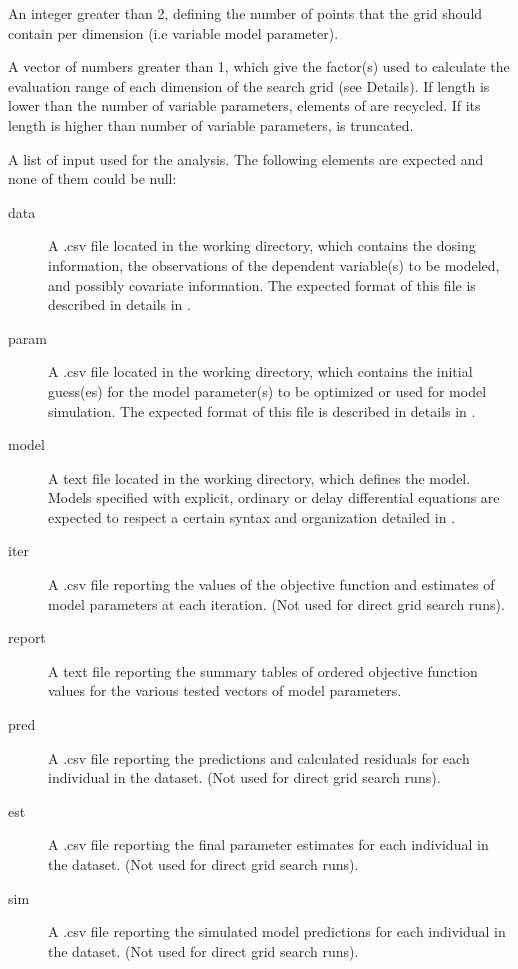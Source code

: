 \begin{Arguments}
\begin{ldescription}
\begin{description}
\end{description}


\item[\code{npts}] An integer greater than 2, defining the number of points that the 
grid should contain per dimension (i.e variable model parameter).

\item[\code{alpha}] A vector of numbers greater than 1, which give the factor(s) used
to calculate the evaluation range of each dimension of the search grid (see 
Details). If  length is lower than the number of variable 
parameters, elements of  are recycled. If its length is higher 
than number of variable parameters,  is truncated.

\item[\code{files}] A list of input used for the analysis. The following elements are
expected and none of them could be null: \begin{description}

\item[data] A .csv file located in the working directory, which contains
the dosing information, the observations of the dependent variable(s)
to be modeled, and possibly covariate information. The expected format 
of this file is described in details in .
\item[param] A .csv file located in the working directory, which contains
the initial guess(es) for the model parameter(s) to be optimized or used
for model simulation. The expected format of this file is described in
details in .
\item[model] A text file located in the working directory, which defines 
the model. Models specified with explicit, ordinary or delay 
differential equations are expected to respect a certain syntax and 
organization detailed in .
\item[iter] A .csv file reporting the values of the objective function
and estimates of model parameters at each iteration. (Not used for
direct grid search runs).
\item[report] A text file reporting the summary tables of ordered 
objective function values for the various tested vectors of model 
parameters.
\item[pred] A .csv file reporting the predictions and calculated residuals
for each individual in the dataset. (Not used for direct grid search 
runs).
\item[est] A .csv file reporting the final parameter estimates for each
individual in the dataset. (Not used for direct grid search runs).
\item[sim] A .csv file reporting the simulated model predictions for each 
individual in the dataset. (Not used for direct grid search runs).

\end{description}


\end{ldescription}
\end{Arguments}
